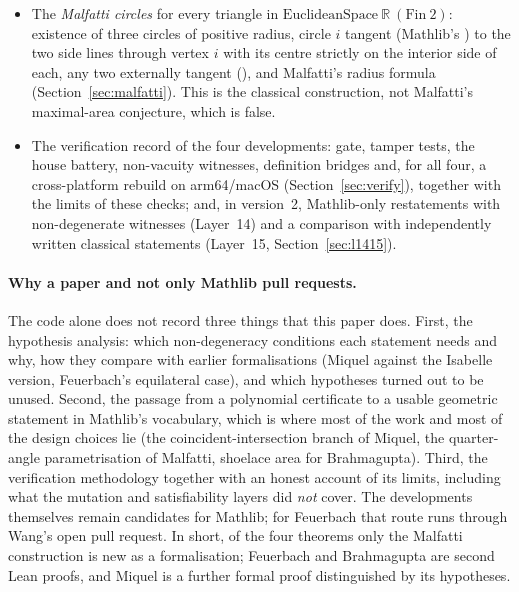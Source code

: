 \documentclass[11pt]{article}
\theoremstyle{definition}
\theoremstyle{remark}
\newcommand{\RR}{\mathbb{R}}
\begin{document}
\begin{itemize}
(Section~\ref{sec:related}). The only parts we did not find there are the two all-four-point
statements, the inequality and the Ptolemy equivalence.
\item The \emph{Malfatti circles} for every triangle in $\mathrm{EuclideanSpace}\ \RR\
(\mathrm{Fin}\ 2)$: existence of three circles of positive radius, circle $i$ tangent (Mathlib's
\mdecl{IsTangent}) to the two side lines through vertex $i$ with its centre strictly on the
interior side of each, any two externally tangent (\mdecl{IsExtTangent}), and Malfatti's radius
formula (Section~\ref{sec:malfatti}). This is the classical construction, not Malfatti's
maximal-area conjecture, which is false.
\item The verification record of the four developments: gate, tamper tests, the house battery,
non-vacuity witnesses, definition bridges and, for all four, a cross-platform rebuild on
arm64/macOS (Section~\ref{sec:verify}), together with the limits of these checks; and, in
version~2, Mathlib-only restatements with non-degenerate witnesses (Layer~14) and a comparison
with independently written classical statements (Layer~15, Section~\ref{sec:l1415}).
\end{itemize}

\paragraph{Why a paper and not only Mathlib pull requests.} The code alone does not record three
things that this paper does. First, the hypothesis analysis: which non-degeneracy conditions each
statement needs and why, how they compare with earlier formalisations (Miquel against the Isabelle
version, Feuerbach's equilateral case), and which hypotheses turned out to be unused. Second, the
passage from a polynomial certificate to a usable geometric statement in Mathlib's vocabulary,
which is where most of the work and most of the design choices lie (the coincident-intersection
branch of Miquel, the quarter-angle parametrisation of Malfatti, shoelace area for Brahmagupta).
Third, the verification methodology together with an honest account of its limits, including what
the mutation and satisfiability layers did \emph{not} cover. The developments themselves remain
candidates for Mathlib; for Feuerbach that route runs through Wang's open pull request.
In short, of the four theorems only the Malfatti construction is new as a formalisation;
Feuerbach and Brahmagupta are second Lean proofs, and Miquel is a further formal proof
distinguished by its hypotheses.
\end{document}
